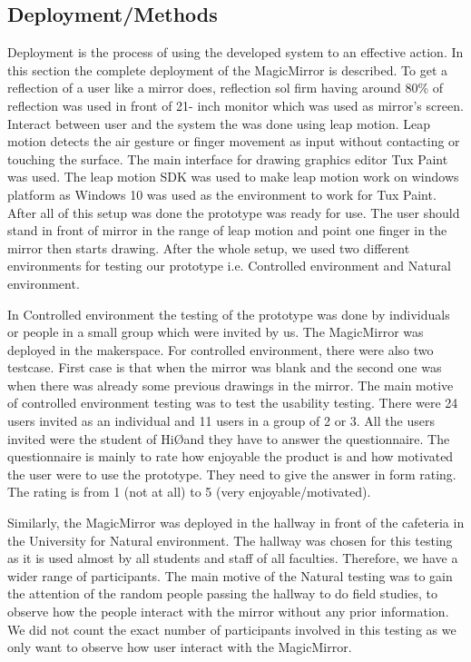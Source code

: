 \documentclass{sigchi-ext}
\begin{document}
\subsection{Deployment/Methods}
Deployment is the process of using the developed system to an effective action. In this section the complete deployment of the MagicMirror is described. To get a reflection of a user like a mirror does, reflection sol firm having around 80\% of reflection was used in front of 21- inch monitor which was used as mirror’s screen. Interact between user and the system the was done using leap motion. Leap motion detects the air gesture or finger movement as input without contacting or touching the surface. The main interface for drawing graphics editor Tux Paint was used. The leap motion SDK was used to make leap motion work on windows platform as Windows 10 was used as the environment to work for Tux Paint. After all of this setup was done the prototype was ready for use. The user should stand in front of mirror in the range of leap motion and point one finger in the mirror then starts drawing.
After the whole setup, we used two different environments for testing our prototype i.e. Controlled environment and Natural environment.

In Controlled environment the testing of the prototype was done by individuals or people in a small group which were invited by us. The MagicMirror was deployed in the makerspace. For controlled environment, there were also two testcase. First case is that when the mirror was blank and the second one was when there was already some previous drawings in the mirror. The main motive of controlled environment testing was to test the usability testing. There were 24 users invited as an individual and 11 users in a group of 2 or 3. All the users invited were the student of Hi\O and they have to answer the questionnaire. The questionnaire is mainly to rate how enjoyable the product is and how motivated the user were to use the prototype. They need to give the answer in form rating. The rating is from 1 (not at all) to 5 (very enjoyable/motivated).
 
Similarly, the MagicMirror was deployed in the hallway in front of the cafeteria in the University for Natural environment. The hallway was chosen for this testing as it is used almost by all students and staff of all faculties. Therefore, we have a wider range of participants. The main motive of the Natural testing was to gain the attention of the random people passing the hallway to do field studies, to observe how the people interact with the mirror without any prior information. We did not count the exact number of participants involved in this testing as we only want to observe how user interact with the MagicMirror.
\end{document}
